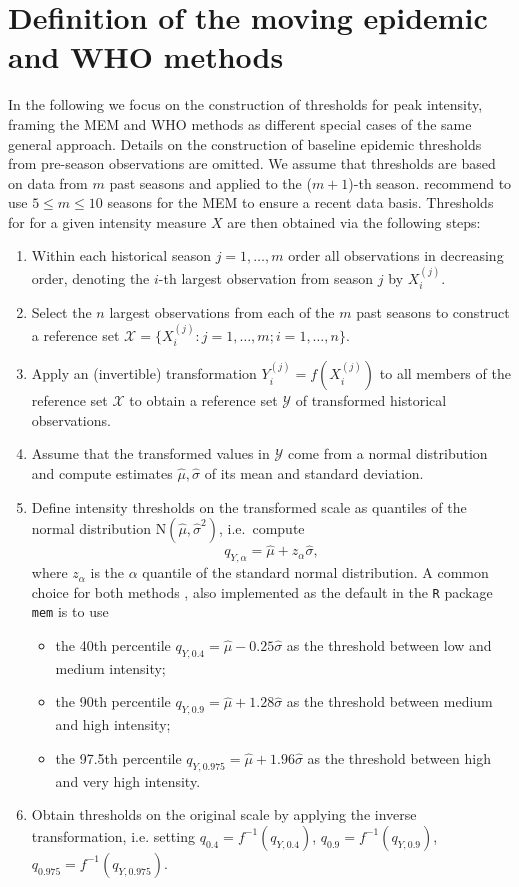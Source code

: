 \documentclass{article}
\begin{document}
\section{Definition of the moving epidemic and WHO methods}
\label{sec:definitions}

In the following we focus on the construction of thresholds  for peak intensity, framing the MEM and WHO methods as different special cases of the same general approach. Details on the construction of baseline epidemic thresholds from pre-season observations are omitted. We assume that thresholds are based on data from $m$ past seasons and applied to the ($m + 1$)-th season. \cite{Vega2015} recommend to use $5 \leq m \leq 10$ seasons for the MEM to ensure a recent data basis. Thresholds for for a given intensity measure $X$ are then obtained via the following steps:

\begin{enumerate}
\item Within each historical season $j = 1, \dots, m$ order all observations in decreasing order, denoting the $i$-th largest observation from season $j$ by $X^{(j)}_i$.
\item Select the $n$ largest observations from each of the $m$ past seasons to construct a reference set $\mathcal{X} = \{X_i^{(j)}: j = 1, \dots, m; i = 1, \dots, n\}$.
\item Apply an (invertible) transformation $Y_i^{(j)} = f(X_i^{(j)})$ to all members of the reference set $\mathcal{X}$ to obtain a reference set $\mathcal{Y}$ of transformed historical observations.
\item Assume that the transformed values in $\mathcal{Y}$ come from a normal distribution and compute estimates $\hat\mu, \hat \sigma$ of its mean and standard deviation.
\item Define intensity thresholds on the transformed scale as quantiles of the normal distribution N$(\hat\mu, \hat\sigma^2)$, i.e.\ compute
$$
q_{Y, \alpha} = \hat{\mu} + z_\alpha \hat{\sigma},
$$
where $z_\alpha$ is the $\alpha$ quantile of the standard normal distribution. A common choice for both methods \citep{WHO2017}, also implemented as the default in the \texttt{R} package \texttt{mem} \citep{Lozano2020} is to use
\begin{itemize}
\item the 40th percentile $q_{Y, 0.4} = \hat\mu - 0.25 \hat\sigma$ as the threshold between low and medium intensity;
\item the 90th percentile $q_{Y, 0.9} = \hat\mu + 1.28 \hat\sigma$ as the threshold between medium and high intensity;
\item the 97.5th percentile $q_{Y, 0.975} = \hat\mu + 1.96\hat\sigma$ as the threshold between high and very high intensity.
\end{itemize}
\item Obtain thresholds on the original scale by applying the inverse transformation, i.e. setting $q_{0.4} = f^{-1}(q_{Y, 0.4})$, $q_{0.9} = f^{-1}(q_{Y, 0.9})$, $q_{0.975} = f^{-1}(q_{Y, 0.975})$.
\end{enumerate}
\end{document}
